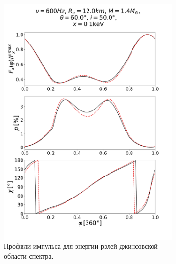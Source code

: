 \documentclass[14pt,a4paper]{extarticle}
\begin{document}
			\begin{figure}[H]
				\centering
				\begin{subfigure}{.45\textwidth}
					\flushleft
					\includegraphics[width=1.1\textwidth]{B0Comb0Ff010.pdf}
					\caption{\small\centering Профили импульса для энергии рэлей-джинсовской области спектра.}
				\end{subfigure}%
				\begin{subfigure}{.45\textwidth}
					\flushright

\end{subfigure}
\end{figure}
\end{document}
